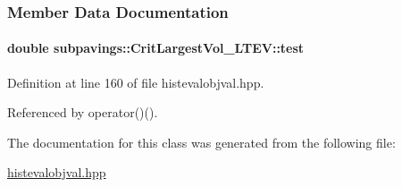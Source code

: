 \subsubsection{\-Member \-Data \-Documentation}
\hypertarget{classsubpavings_1_1CritLargestVol__LTEV_af79b24be539ff92de434c87babebd81d}{
\paragraph[{test}]{\setlength{\rightskip}{0pt plus 5cm}double {\bf subpavings\-::\-Crit\-Largest\-Vol\-\_\-\-L\-T\-E\-V\-::test}}}\label{classsubpavings_1_1CritLargestVol__LTEV_af79b24be539ff92de434c87babebd81d}


\-Definition at line 160 of file histevalobjval.\-hpp.



\-Referenced by operator()().



\-The documentation for this class was generated from the following file\-:\begin{DoxyCompactItemize}
\item 
\hyperlink{histevalobjval_8hpp}{histevalobjval.\-hpp}\end{DoxyCompactItemize}
